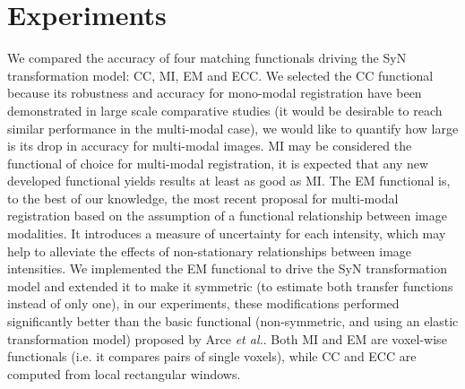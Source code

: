 \section{Experiments}
We compared the accuracy of four matching functionals driving the SyN transformation model: CC, MI, EM and ECC. We selected the CC functional because its robustness and accuracy for mono-modal registration have been demonstrated in large scale comparative studies \citep{Klein2009, Klein2010, Rohlfing2012} (it would be desirable to reach similar performance in the multi-modal case), we would like to quantify how large is its drop in accuracy for multi-modal images. MI \citep{Maes1997, Mattes2003} may be considered the functional of choice for multi-modal registration, it is expected that any new developed functional yields results at least as good as MI. The EM functional \cite{Arce-santana2014} is, to the best of our knowledge, the most recent proposal for multi-modal registration based on the assumption of a functional relationship between image modalities. It introduces a measure of uncertainty for each intensity, which may help to alleviate the effects of non-stationary relationships between image intensities. We implemented the EM functional to drive the SyN transformation model and extended it to make it symmetric (to estimate both transfer functions instead of only one), in our experiments, these modifications performed significantly better than the basic functional (non-symmetric, and using an elastic transformation model) proposed by Arce {\it et al.}\cite{Arce-santana2014}. Both MI and EM are voxel-wise functionals (i.e. it compares pairs of single voxels), while CC and ECC are computed from local rectangular windows.

